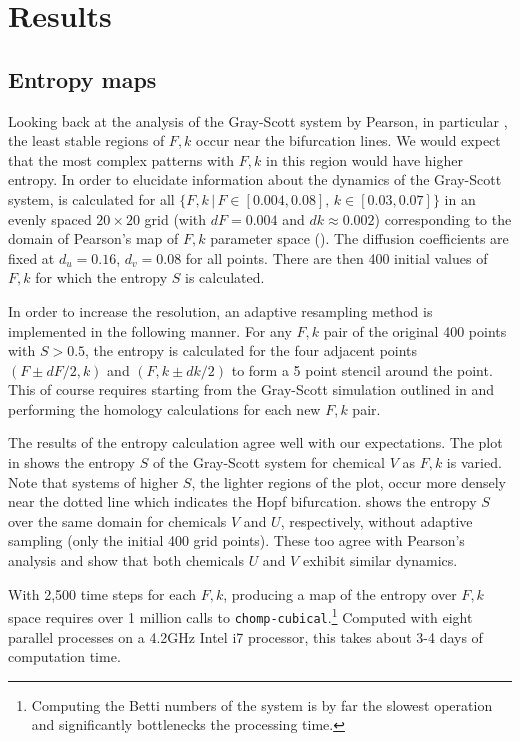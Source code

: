 \chapter{Results} \label{ch:results}

\section{Entropy maps}

Looking back at the analysis of the Gray-Scott system by Pearson, in particular , the least stable regions of $F, k$ occur near the bifurcation lines. We would expect that the most complex patterns with $F, k$ in this region would have higher entropy. In order to elucidate information about the dynamics of the Gray-Scott system,  is calculated for all $\{ F, k \, | \, F \in [0.004, 0.08], \, k \in [0.03, 0.07] \}$ in an evenly spaced $20 \times 20$ grid (with $dF = 0.004$ and $dk \approx 0.002$) corresponding to the domain of Pearson's map of $F, k$ parameter space (). The diffusion coefficients are fixed at $d_u = 0.16$, $d_v = 0.08$ for all points. There are then 400 initial values of $F,k$ for which the entropy $S$ is calculated.

In order to increase the resolution, an adaptive resampling method is implemented in the following manner. For any $F, k$ pair of the original 400 points with $S > 0.5$, the entropy is calculated for the four adjacent points $(F \pm dF/2, k)$ and $(F, k \pm dk/2)$ to form a 5 point stencil around the point. This of course requires starting from the Gray-Scott simulation outlined in  and performing the homology calculations for each new $F,k$ pair.

The results of the entropy calculation agree well with our expectations. The plot in  shows the entropy $S$ of the Gray-Scott system for chemical $V$ as $F, k$ is varied. Note that systems of higher $S$, the lighter regions of the plot, occur more densely near the dotted line which indicates the Hopf bifurcation.  shows the entropy $S$ over the same domain for chemicals $V$ and $U$, respectively, without adaptive sampling (only the initial 400 grid points). These too agree with Pearson's analysis and show that both chemicals $U$ and $V$ exhibit similar dynamics.

With 2,500 time steps for each $F,k$, producing a map of the entropy over $F,k$ space requires over 1 million calls to \texttt{chomp-cubical}.\footnote{Computing the Betti numbers of the system is by far the slowest operation and significantly bottlenecks the processing time.} Computed with eight parallel processes on a 4.2GHz Intel i7 processor, this takes about 3-4 days of computation time.

